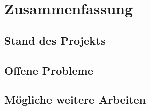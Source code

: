 \chapter{Zusammenfassung}
\label{chapter:summary}
    \section{Stand des Projekts}
    
    \section{Offene Probleme}
    
    \section{Mögliche weitere Arbeiten}
